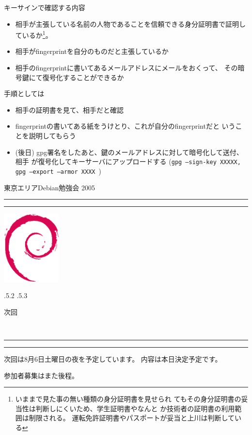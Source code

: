 \documentclass[mingoth]{jsarticle}
\makeatletter
\renewcommand{\section}{\@startsection{section}{1}{\z@}%
    {\Cvs \@plus.5\Cdp \@minus.2\Cdp}%
    {.5\Cvs \@plus.3\Cdp}%
    {\normalfont\Large\headfont\raggedright\centering}} %
\newcommand{\dancersection}[2]{%
\newpage
東京エリアDebian勉強会 2005
\hrule
\vspace{0.5mm}
\hrule
\hfill{}\includegraphics[width=3cm]{image200502/openlogo-nd.eps}\\
\vspace{-4cm}
\begin{center}
  \section{#1}
\end{center}
\hfill{}#2\hspace{3cm}\space\\
\hrule
\hrule
\vspace{1cm}
}
\makeatother
\begin{document}
キーサインで確認する内容
\begin{itemize}
 \item 相手が主張している名前の人物であることを信頼できる身分証明書で証明し
       ているか\footnote{いままで見た事の無い種類の身分証明書を見せられ
       てもその身分証明書の妥当性は判断しにくいため、学生証明書やなんと
       か技術者の証明書の利用範囲は制限される。
       運転免許証明書やパスポートが妥当と上川は判断している}。
 \item 相手がfingerprintを自分のものだと主張しているか
 \item 相手のfingerprintに書いてあるメールアドレスにメールをおくって、
       その暗号鍵にて復号化することができるか
\end{itemize}

手順としては
\begin{itemize}
 \item 相手の証明書を見て、相手だと確認
 \item fingerprintの書いてある紙をうけとり、これが自分のfingerprintだと
       いうことを説明してもらう
 \item (後日) gpg署名をしたあと、鍵のメールアドレスに対して暗号化して送付、相手
       が復号化してキーサーバにアップロードする
       ({\tt gpg --sign-key XXXXX, gpg --export --armor XXXX })
\end{itemize}


\dancersection{次回}{}

次回は8月6日土曜日の夜を予定しています。
内容は本日決定予定です。

参加者募集はまた後程。
\end{document}
